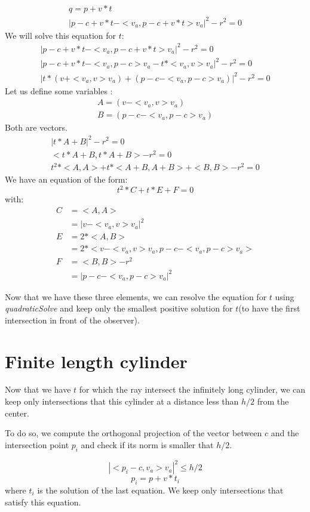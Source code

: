 \documentclass{article}
\begin{document}
\begin{gather*}
    q=p+v*t \\
    |p-c+v*t-<v_a, p-c+v*t>v_a|^2-r^2=0
\end{gather*}
We will solve this equation for $t$:
\begin{gather*}
    |p-c+v*t-<v_a, p-c+v*t>v_a|^2-r^2=0\\
    |p-c+v*t - <v_a, p-c>v_a - t*<v_a, v>v_a|^2 -r^2=0\\
    |t*(v+<v_a, v>v_a) + (p-c- <v_a, p-c>v_a)|^2 -r^2 = 0
\end{gather*}
Let us define some variables :
\begin{gather*}
    A = (v-<v_a, v>v_a)\\
    B = (p-c- <v_a, p-c>v_a)
\end{gather*}
Both are vectors.
\begin{gather*}
    |t*A + B|^2 -r^2 = 0\\
    <t*A+B, t*A+B> -r^2 = 0\\
    t^2 * <A,A> + t*<A+B, A+B> + <B,B> -r^2 = 0
\end{gather*}
We have an equation of the form:
$$t^2*C + t*E + F = 0$$
with:
\begin{align*}
    C &= <A,A> \\
    &= |v-<v_a, v>v_a|^2\\
    E &= 2*<A, B> \\
    &= 2*<v-<v_a, v>v_a, p-c- <v_a, p-c>v_a>\\
    F &= <B,B> -r^2 \\
    &= |p-c- <v_a, p-c>v_a|^2
\end{align*}


Now that we have these three elements, we can resolve the equation for $t$ using \textit{quadraticSolve} and keep only the smallest positive solution for $t$(to have the first intersection in front of the observer).

\section{Finite length cylinder}
Now that we have $t$ for which the ray intersect the infinitely long cylinder, we can keep only intersections that this cylinder at a distance less than $h/2$ from the center.

To do so, we compute the orthogonal projection of the vector between $c$ and the intersection point $p_i$ and check if its norm is smaller that $h/2$.

$$|<p_i-c, v_a>v_a|^2 \leq h/2$$
$$p_i = p+v*t_i$$
where $t_i$ is the solution of the last equation. We keep only intersections that satisfy this equation.
\end{document}
